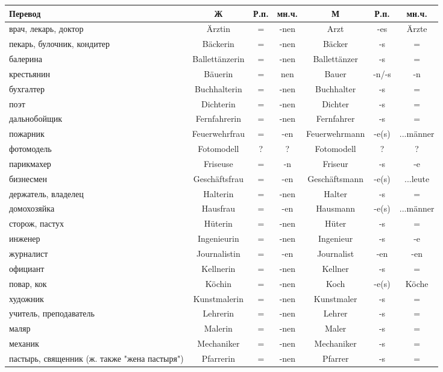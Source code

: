 \begin{longtable}{|p{4cm}|c|c|c|c|c|c|}
\hline
Перевод & Ж & Р.п. & мн.ч. & М & Р.п. & мн.ч. \\
\hline\endhead

 врач, лекарь, доктор & \"Arztin & = & -nen & Arzt & -es & \"Arzte \\
 пекарь, булочник, кондитер & B\"ackerin & = & -nen & B\"acker & -s & = \\
 балерина & Ballett\"anzerin & = & -nen & Ballett\"anzer & -s & = \\
 крестьянин & B\"auerin & = & nen & Bauer & -n/-s & -n \\
 бухгалтер & Buchhalterin & = & -nen & Buchhalter & -s & = \\
 поэт & Dichterin & = & -nen & Dichter & -s & = \\
 дальнобойщик & Fernfahrerin & = & -nen & Fernfahrer & -s & = \\
 пожарник & Feuerwehrfrau & = & -en & Feuerwehrmann & -e(s) & ...m\"anner \\
 фотомодель & Fotomodell & ? & ? & Fotomodell & ? & ? \\
 парикмахер & Friseuse & = & -n & Friseur & -s & -e \\
 бизнесмен & Gesch\"aftsfrau & = & -en & Gesch\"aftsmann & -e(s) & ...leute \\
 держатель, владелец & Halterin & = & -nen & Halter & -s & = \\
 домохозяйка & Hausfrau & = & -en & Hausmann & -e(s) & ...m\"anner \\
 сторож, пастух & H\"uterin & = & -nen & H\"uter & -s & = \\
 инженер & Ingenieurin & = & -nen & Ingenieur & -s & -e \\
 журналист & Journalistin & = & -en & Journalist & -en & -en \\
 официант & Kellnerin & = & -nen & Kellner & -s & = \\
 повар, кок & K\"ochin & = & -nen & Koch & -e(s) & K\"oche \\
 художник & Kunstmalerin & = & -nen & Kunstmaler & -s & = \\
 учитель, преподаватель & Lehrerin & = & -nen & Lehrer & -s & = \\
 маляр & Malerin & = & -nen & Maler & -s & = \\
 механик & Mechaniker & = & -nen & Mechaniker & -s & = \\
 пастырь, священник (ж. также "жена пастыря") & Pfarrerin & = & -nen & Pfarrer & -s & = \\

\end{longtable}
